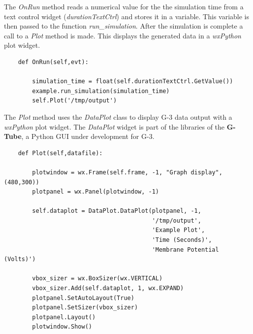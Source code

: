 \documentclass[12pt]{article}
\begin{document}

The {\it OnRun} method reads a numerical value for the the simulation
time from a text control widget ({\it durationTextCtrl}) and stores it
in a variable.  This variable is then passed to the function {\it
  run\_simulation}.  After the simulation is complete a call to a {\it
  Plot} method is made. This displays the generated data in a {\it
  wxPython} plot widget.

{\footnotesize
  \linenumbers
\begin{verbatim}
    def OnRun(self,evt):

        simulation_time = float(self.durationTextCtrl.GetValue())
        example.run_simulation(simulation_time)
        self.Plot('/tmp/output')
\end{verbatim}
}
 



The {\it Plot} method uses the {\it DataPlot} class to display G-3 data
output with a {\it wxPython} plot widget.  The {\it DataPlot} widget
is part of the libraries of the {\bf G-Tube}, a Python GUI under
development for G-3.

{\footnotesize
  \linenumbers
\begin{verbatim} 
    def Plot(self,datafile):

        plotwindow = wx.Frame(self.frame, -1, "Graph display", (480,300))
        plotpanel = wx.Panel(plotwindow, -1)

        self.dataplot = DataPlot.DataPlot(plotpanel, -1,
                                          '/tmp/output',
                                          'Example Plot',
                                          'Time (Seconds)',
                                          'Membrane Potential (Volts)')

        vbox_sizer = wx.BoxSizer(wx.VERTICAL)
        vbox_sizer.Add(self.dataplot, 1, wx.EXPAND)
        plotpanel.SetAutoLayout(True)
        plotpanel.SetSizer(vbox_sizer)
        plotpanel.Layout()
        plotwindow.Show()
\end{verbatim}
}
\end{document}
